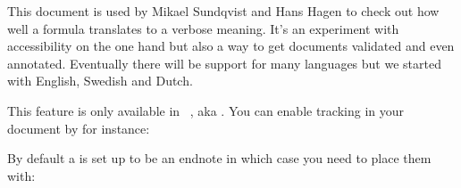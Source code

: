 


\startbuffer [colophon]

\startsubject[title=About this document]

This document is used by Mikael Sundqvist and Hans Hagen to check out how well a
formula translates to a verbose meaning. It's an experiment with accessibility on
the one hand but also a way to get documents validated and even annotated.
Eventually there will be support for many languages but we started with English,
Swedish and Dutch.

\blank

This feature is only available in \CONTEXT\ \MKXL, aka \LMTX. You can enable
tracking in your document by for instance:

\starttyping[option=TEX]
\setuptagging
  [state=start]


\setmathgroupset
  [mydemogroup]

\setupnote
  [mathnote]
  [location=page]

\stoptyping

By default a  is set up to be an endnote in which case you need
to place them with:

\starttyping[option=TEX]
\placenote[mathnode]
\stoptyping

\stopsubject
\stopbuffer

\startdocument
  [title={Meaningfull Math},
   author={Mikael Sundqvist & Hans Hagen}]

\StartExample
\StopExample

\StartExample
\StopExample

\StartExample
\StopExample

\StartExample
\StopExample

\StartExample
\StopExample

\StartExample
\StopExample

